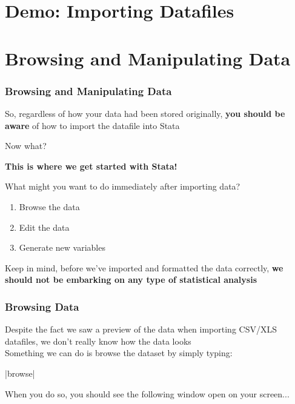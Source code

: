 \documentclass[10pt, compress]{beamer}
\begin{document}
\section{Demo: Importing Datafiles}

\section{Browsing and Manipulating Data}

\begin{frame}[fragile]
\frametitle{Browsing and Manipulating Data}
So, regardless of how your data had been stored originally, \textbf{you should be aware} of how to import the datafile into Stata

\begin{center}
\alert{Now what?}	
\end{center}

\begin{center}
\textbf{This is where we get started with Stata!}	
\end{center}

What might you want to do immediately after importing data?
\begin{enumerate}
	\item Browse the data
	\item Edit the data
	\item Generate new variables  
\end{enumerate}
Keep in mind, before we've imported and formatted the data correctly, \textbf{we should not be embarking on any type of statistical analysis}
\end{frame}

\begin{frame}[fragile]
\frametitle{Browsing Data}
Despite the fact we saw a preview of the data when importing CSV/XLS datafiles, we don't really know how the data looks\\

Something we can do is \alert{browse} the dataset by simply typing:

\begin{center}
|browse|
\end{center}

When you do so, you should see the following window open on your screen...

\end{frame}
\end{document}

